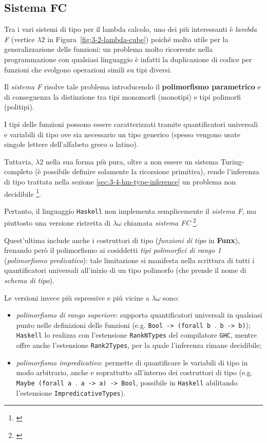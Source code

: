 \subsection{Sistema FC}
\label{sec:3-3-system-fc}

Tra i vari sistemi di tipo per il lambda calcolo, uno dei più interessanti è \textit{lambda F}
(vertice $\lambda2$ in Figura~\ref{fig:3-2-lambda-cube}) poiché molto utile per la generalizzazione delle funzioni:
un problema molto ricorrente nella programmazione con qualsiasi linguaggio è infatti la duplicazione di codice
per funzioni che svolgono operazioni simili su tipi diversi.


Il \textit{sistema F} risolve tale problema introducendo il \textbf{polimorfismo parametrico}
e di conseguenza la distinzione tra tipi monomorfi (monotipi) e tipi polimorfi (politipi).

\noindent I tipi delle funzioni possono essere caratterizzati tramite quantificatori universali e variabili di tipo
ove sia necessario un tipo generico (spesso vengono usate singole lettere dell'alfabeto greco o latino).


Tuttavia, $\lambda2$ nella sua forma più pura, oltre a non essere un sistema Turing-completo
(è possibile definire solamente la ricorsione primitiva), rende l'inferenza di tipo trattata nella sezione
\ref{sec:3-4-hm-type-inference} un problema non decidibile%
\footnote{ \cite{Wells-1999-TypabilityUndecidable}}.

\noindent Pertanto, il linguaggio \texttt{Haskell} non implementa semplicemente il \textit{sistema F},
ma piuttosto una versione ristretta di $\lambda\omega$ chiamata \textit{sistema FC}%
\footnote{ \cite{Eisenberg-2015-SystemFC}}.

\noindent Quest'ultima include anche i costruttori di tipo (\textit{funzioni di tipo} in \textbf{Funx}),
frenando però il polimorfismo ai cosiddetti \textit{tipi polimorfici di rango 1} (\textit{polimorfismo predicativo}):
tale limitazione si manifesta nella scrittura di tutti i quantificatori universali all'inizio di un tipo polimorfo
(che prende il nome di \textit{schema di tipo}).

\noindent Le versioni invece più espressive e più vicine a $\lambda\omega$ sono:
\begin{itemize}
    \item \textit{polimorfismo di rango superiore}: supporta quantificatori universali in qualsiasi punto
          nelle definizioni delle funzioni (e.g. \texttt{Bool -> (forall b $\mathord{.}$ b -> b)});
          \texttt{Haskell} lo realizza con l'estensione \texttt{RankNTypes} del compilatore \texttt{GHC},
          mentre offre anche l'estensione \texttt{Rank2Types}, per la quale l'inferenza rimane decidibile;
    \item \textit{polimorfismo impredicativo}: permette di quantificare le variabili di tipo in modo arbitrario,
          anche e soprattutto all'interno dei costruttori di tipo (e.g. \texttt{Maybe (forall a $\mathord{.}$ a -> a) -> Bool},
          possibile in \texttt{Haskell} abilitando l'estensione \texttt{ImpredicativeTypes}).
\end{itemize}

